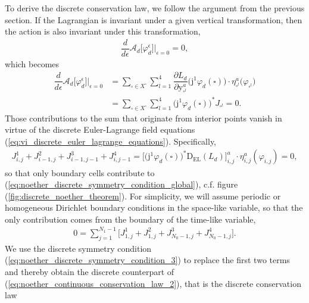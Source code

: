 \documentclass[12pt,a4paper,reqno]{article}
\begin{document}
To derive the discrete conservation law, we follow the argument from the previous section.
If the Lagrangian is invariant under a given vertical transformation, then the action is also invariant under this transformation,
\begin{align}
\dfrac{d}{d {\ensuremath{\epsilon}}} \mathcal{A}_{d} \big[ {\ensuremath{\varphi}}_{d}^{\ensuremath{\epsilon}} \big] \bigg\vert_{{\ensuremath{\epsilon}} = 0} = 0 ,
\end{align}
which becomes
\begin{align}\label{eq:noether_discrete_symmetry_condition_global}
\dfrac{d}{d {\ensuremath{\epsilon}}} \mathcal{A}_{d} \big[ {\ensuremath{\varphi}}_{d}^{\ensuremath{\epsilon}} \big] \bigg\vert_{{\ensuremath{\epsilon}} = 0}
\nonumber
&= \sum \limits_{\square \in X^{\square}} \sum \limits_{l=1}^{4} \dfrac{\partial L_{d}}{\partial {\ensuremath{{\ensuremath{\mathrm{{y}}}}}}^{a}_{\square^l}} \big( {\ensuremath{\mathrm{j}}}^{1} {\ensuremath{\varphi}}_{d} (\square) \big) \cdot \eta^{a}_{\square^{l}} \big( {\ensuremath{\varphi}}_{\square^{l}} \big) \\
&= \sum \limits_{\square \in X^{\square}} \sum \limits_{l=1}^{4} \big( {\ensuremath{\mathrm{j}}}^{1} {\ensuremath{\varphi}}_{d} (\square) \big)^{*} J_{\square^{l}}
 = 0 .
\end{align}
Those contributions to the sum that originate from interior points vanish in virtue of the discrete Euler-Lagrange field equations (\ref{eq:vi_discrete_euler_lagrange_equations}).
Specifically,
\begin{align}
  J^{1}_{i,  j  }
+ J^{2}_{i-1,j  }
+ J^{3}_{i-1,j-1}
+ J^{4}_{i,  j-1}
= \big[ \big( {\ensuremath{\mathrm{j}}}^{1} {\ensuremath{\varphi}}_{d} (\square) \big)^{*} {\ensuremath{\mathrm{D_{EL}}}}(L_{d}) \big]_{i,j}^{a} \cdot \eta^{a}_{i,j} ({\ensuremath{\varphi}}_{i,j})
= 0 ,
\end{align}
so that only boundary cells contribute to (\ref{eq:noether_discrete_symmetry_condition_global}), c.f. figure (\ref{fig:discrete_noether_theorem}).
For simplicity, we will assume periodic or homogeneous Dirichlet boundary conditions in the space-like variable, so that the only contribution comes from the boundary of the time-like variable,
\begin{align}\label{eq:noether_discrete_conservation_law_1}
0 = \sum \limits_{j=1}^{N_{1}-1} \Big[
  J^{1}_{1,j}
+ J^{2}_{1,j}
+ J^{3}_{N_{0}-1,j}
+ J^{4}_{N_{0}-1,j}
\Big] .
\end{align}
We use the discrete symmetry condition (\ref{eq:noether_discrete_symmetry_condition_3}) to replace the first two terms and thereby obtain the discrete counterpart of (\ref{eq:noether_continuous_conservation_law_2}), that is the discrete conservation law
\end{document}
